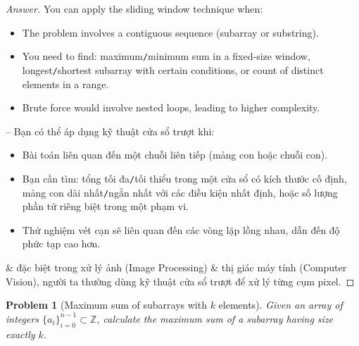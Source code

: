 \documentclass{article}
\newtheorem{problem}{Problem}
\begin{document}
\begin{proof}[Answer]
    You can apply the sliding window technique when:
    \begin{itemize}
        \item The problem involves a contiguous sequence (subarray or substring).
        \item You need to find: maximum{\tt/}minimum sum in a fixed-size window, longest{\tt/}shortest subarray with certain conditions, or count of distinct elements in a range.
        \item Brute force would involve nested loops, leading to higher complexity.
    \end{itemize}
    -- Bạn có thể áp dụng kỹ thuật cửa sổ trượt khi:
    \begin{itemize}
        \item Bài toán liên quan đến một chuỗi liên tiếp (mảng con hoặc chuỗi con).
        \item Bạn cần tìm: tổng tối đa{\tt/}tối thiểu trong một cửa sổ có kích thước cố định, mảng con dài nhất{\tt/}ngắn nhất với các điều kiện nhất định, hoặc số lượng phần tử riêng biệt trong một phạm vi.
        \item Thử nghiệm vét cạn sẽ liên quan đến các vòng lặp lồng nhau, dẫn đến độ phức tạp cao hơn.
    \end{itemize}
    \& đặc biệt trong xử lý ảnh (Image Processing) \& thị giác máy tính (Computer Vision), người ta thường dùng kỹ thuật cửa sổ trượt để xử lý từng cụm pixel.
\end{proof}

\begin{problem}[Maximum sum of subarrays with $k$ elements]
    Given an array of integers $\{a_i\}_{i=0}^{n-1}\subset\mathbb{Z}$, calculate the maximum sum of a subarray having size exactly $k$.
\end{problem}
\end{document}
